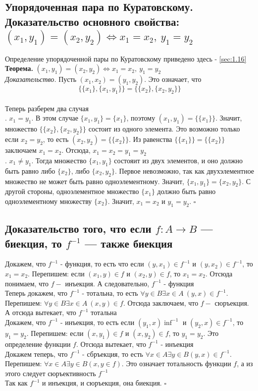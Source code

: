 \documentclass[a4paper]{article}
\newcommand{\qed}{\hfill$\square$}
\begin{document}
\subsection{Упорядоченная пара по Куратовскому. Доказательство основного свойства: $(x_1,y_1)=(x_2,y_2)\Leftrightarrow x_1=x_2,\ y_1=y_2$}
\label{sec:2.5}Определение упорядоченной пары по Куратовскому приведено здесь - \ref{sec:1.16}\\[2mm]
\textbf{Теорема.} $(x_1, y_1)=(x_2,y_2)\Leftrightarrow x_1=x_2,\ y_1=y_2$\\[2mm]
\textit{Доказательство.} Пусть $(x_1,x_2)=(y_1,y_2)$. Это означает, что\\[2mm]
$$\{\{x_1\},\{x_1,y_1\}\}=\{\{x_2\},\{x_2,y_2\}\}$$\\[2mm]
Теперь разберем два случая\\[2mm]
. $x_1=y_1$. В этом случае $\{x_1,y_1\}=\{x_1\}$, поэтому $(x_1,y_1)=\{\{x_1\}\}$. Значит, множество $\{\{x_2\},\{x_2,y_2\}\}$ состоит из одного элемента. Это возможно только если $x_2=y_2$, то есть $(x_2,y_2)=\{\{x_2\}\}$. Из равенства $\{\{x_1\}\}=\{\{x_2\}\}$ заключаем $x_1=x_2$. Отсюда, $x_1=x_2=y_1=y_2$\\[2mm]
. $x_1\ne y_1$. Тогда множество $\{x_1,y_1\}$ состояит из двух элементов, и оно должно быть равно либо $\{x_2\}$, либо $\{x_2,y_2\}$. Первое невозможно, так как двухэлементное множество не может быть равно одноэлементному. Значит, $\{x_1,y_1\}=\{x_2,y_2\}$. С другой стороны, одноэлементное множество $\{x_1\}$ должно быть равно одноэлементному множеству $\{x_2\}$. Значит, $x_1=x_2$ и $y_1=y_2$. \qed
\subsection{Доказательство того, что если $f: A\rightarrow B$ — биекция, то $f^{-1}$ — также биекция}
\label{sec:2.6}Докажем, что $f^{-1}$ - функция, то есть что если $(y, x_1)\in f^{-1}$ и $(y, x_2)\in f^{-1}$, то $x_1=x_2$. Перепишем: если $(x_1, y)\in f$ и $(x_2, y)\in f$, то $x_1=x_2$. Отсюда понимаем, что $f-$ инъекция. А следовательно, $f^{-1}$ - функция\\[2mm]
\indent Теперь докажем, что $f^{-1}$ - тотальна, то есть $\forall y\in B\exists x\in A\ (y,x)\in f^{-1}$. Перепишем: $\forall y\in B\exists x\in A\ (x,y)\in f$. Отсюда заключаем, что $f-$ сюръекция. А отсюда вытекает, что $f^{-1}$ тотальна\\[2mm]
\indent Докажем, что $f^{-1}$ - инъекция, то есть если $(y_1,x)\inf^{-1}$ и $(y_2,x)\in f^{-1}$, то $y_1=y_2$. Перепишем: если $(x,y_1)\in f$ и $(x,y_2)\in f$, то $y_1=y_2$. Это определение функции $f$. Отсюда вытекает, что $f^{-1}$ - инъекция\\[2mm]
\indent Докажем теперь, что $f^{-1}$ - сбръекция, то есть $\forall x\in A\exists y \in B (y,x)\in f^{-1}$. Перепишем: $\forall x\in A\exists y\in B (x,y\in f)$. Это означает тотальность функции $f$, а из этого следует сюръективность $f^{-1}$\\[2mm]
\indent Так как $f^{-1}$ и инъекция, и сюръекция, она биекция. \qed
\end{document}
